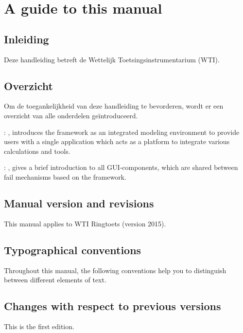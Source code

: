 
\chapter{A guide to this manual\label{chap:guide}}

\section{Inleiding}
Deze handleiding betreft de Wettelijk Toetsingsinstrumentarium (WTI).

\section{Overzicht}
Om de toegankelijkheid van deze handleiding te bevorderen, wordt er een overzicht van alle onderdelen geïntroduceerd.

: , introduces the framework as an integrated modeling environment to provide users with a single application which acts as a platform to integrate various calculations and tools.

: , gives a brief introduction to all GUI-components, which are shared between fail mechanisms based on the framework.

\section{Manual version and revisions}
This manual applies to WTI Ringtoets (version 2015).

\section{Typographical conventions}
Throughout this manual, the following conventions help you to distinguish between different
elements of text.


\section{Changes with respect to previous versions}
This is the first edition.